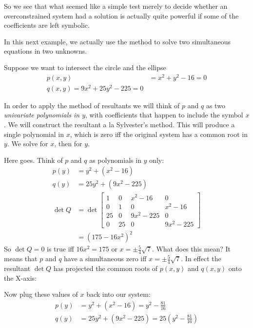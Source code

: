 \begin{numerical-example}
  So we see that what seemed like a simple test merely to decide
  whether an overconstrained system had a solution is actually quite
  powerful if some of the coefficients are left symbolic.

In this next example, we actually use the method to solve two
simultaneous equations in two unknowns.


Suppose we want to intersect the circle and the ellipse
\begin{align*}
  p(x, y) &= x^2 + y^2 - 16 = 0 \\
  q(x, y) = 9x^2 + 25y^2 - 225 = 0
\end{align*}

In order to apply the method of resultants we will think of $p$ and
$q$ as two \textit{univariate polynomials in $y$}, with coefficients
that happen to include the symbol $x$. We will construct the resultant
a la Sylvester's method. This will produce a single polynomial in $x$,
which is zero iff the original system has a common root in $y$. We
solve for $x$, then for $y$.

Here goes. Think of $p$ and $q$ as polynomials in $y$ only:
\begin{align*}
  p(y) &= y^2 + (x^2 - 16) \\
  q(y) &= 25y^2 + (9x^2 - 225) \\
  \det Q &= \det
           \begin{bmatrix}
             1 & 0 & x^2 - 16 & 0 \\
             0 & 1 & 0 & x^2 - 16 \\
             25 & 0 & 9x^2 - 225 & 0 \\
             0 & 25 & 0 & 9x^2 - 225
           \end{bmatrix} \\
  &= (175 - 16x^2)^2
\end{align*}
So $\det Q = 0$ is true iff $16x^2 = 175$ or $x = \pm
\frac{5}{4}\sqrt{7}$. What does this mean? It means that $p$ and $q$
have a simultaneous zero iff $x = \pm
\frac{5}{4}\sqrt{7}$. In effect the resultant $\det Q$ has projected
the common roots of $p(x, y)$ and $q(x, y)$ onto the X-axis:


Now plug these values of $x$ back into our system:
\begin{align*}
  p(y) &= y^2 + (x^2 - 16) = y^2 - \frac{81}{16} \\
  q(y)&= 25y^2 + (9x^2 - 225) = 25(y^2 - \frac{81}{16})
\end{align*}


\end{numerical-example}
